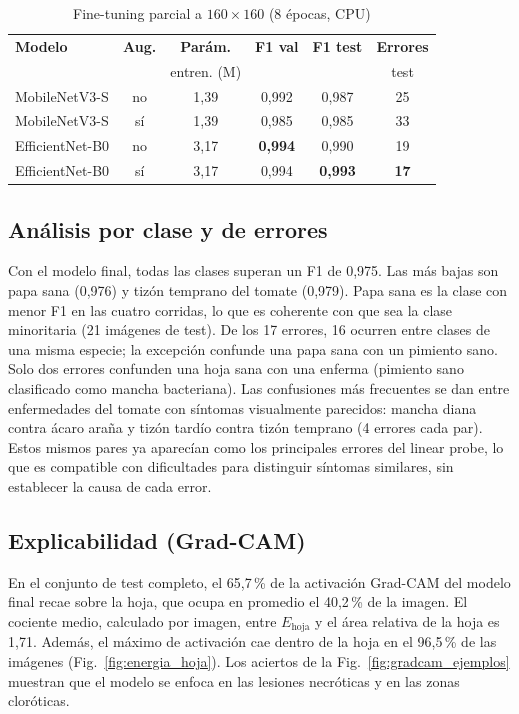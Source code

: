 \begin{table}[t]
\centering
\caption{Fine-tuning parcial a $160\times160$ (8 épocas, CPU)}
\label{tab:finetuning}
\setlength{\tabcolsep}{4pt}
\begin{tabular}{@{}lccccc@{}}
\toprule
\textbf{Modelo} & \textbf{Aug.} & \textbf{Parám.} & \textbf{F1 val} & \textbf{F1 test} & \textbf{Errores} \\
 & & entren. (M) & & & test \\
\midrule
MobileNetV3-S   & no & 1,39 & 0,992          & 0,987          & 25          \\
MobileNetV3-S   & sí & 1,39 & 0,985          & 0,985          & 33          \\
EfficientNet-B0 & no & 3,17 & \textbf{0,994} & 0,990          & 19          \\
EfficientNet-B0 & sí & 3,17 & 0,994 & \textbf{0,993} & \textbf{17} \\
\bottomrule
\end{tabular}
\end{table}

\subsection{Análisis por clase y de errores}
\label{subsec:res_errores}
Con el modelo final, todas las clases superan un F1 de 0,975. Las más bajas son papa sana
(0,976) y tizón temprano del tomate (0,979). Papa sana es la clase con menor F1 en las cuatro
corridas, lo que es coherente con que sea la clase minoritaria (21 imágenes de test). De los
17 errores, 16 ocurren entre clases de una misma especie; la excepción confunde una papa sana
con un pimiento sano. Solo dos errores confunden una hoja sana con una enferma (pimiento sano
clasificado como mancha bacteriana). Las confusiones más frecuentes se dan entre enfermedades
del tomate con síntomas visualmente parecidos: mancha diana contra ácaro araña y tizón tardío
contra tizón temprano (4 errores cada par). Estos mismos pares ya aparecían como los
principales errores del linear probe, lo que es compatible con dificultades para distinguir
síntomas similares, sin establecer la causa de cada error.

\subsection{Explicabilidad (Grad-CAM)}
\label{subsec:res_gradcam}
En el conjunto de test completo, el 65,7\,\% de la activación Grad-CAM del modelo final recae
sobre la hoja, que ocupa en promedio el 40,2\,\% de la imagen. El cociente medio, calculado
por imagen, entre $E_{\text{hoja}}$ y el área relativa de la hoja es 1,71. Además, el máximo de activación cae
dentro de la hoja en el 96,5\,\% de las imágenes (Fig.~\ref{fig:energia_hoja}). Los aciertos
de la Fig.~\ref{fig:gradcam_ejemplos} muestran que el modelo se enfoca en las lesiones
necróticas y en las zonas cloróticas.

